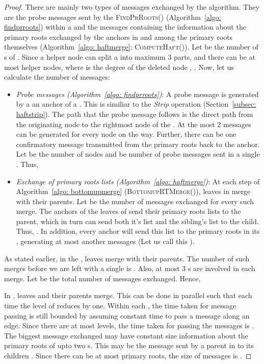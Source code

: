 \documentclass[11pt, letter]{article}
\begin{document}
\begin{proof} There are mainly two types of messages exchanged by the algorithm. They are the probe messages sent by the
\textsc{FindPrRoots()} (Algorithm~\ref{algo: findprroots}) within a  and the messages containing the information
about the primary roots exchanged by the anchors in  and among the primary roots themselves (Algorithm~\ref{algo:
haftmerge}: \textsc{ComputeHaft()}). Let  be the number of s of . Since a helper
node can split a  into maximum 3 parts, and there can be at most  helper nodes, where  is the degree of the
deleted node , .
Now, let us calculate the number of messages:
\begin{itemize}
\item \emph{Probe messages (Algorithm~\ref{algo: findprroots})}: A probe message is generated by a
 an anchor of a . This is similiar to the \emph{Strip} operation
(Section~\ref{subsec: haftstrip}). The path that the probe message follows is the direct path from the originating
node to the rightmost node of the . At the most 2 messages can be generated for every node on the way. Further,
there can be one confirmatory message transmitted from the primary roots back to the anchor. Let  be 
the number of nodes and  be number of probe messages sent in a single .
Thus, 

\item \emph{Exchange of primary roots lists (Algorithm~\ref{algo: haftmerge})}:  At each step of Algorithm~\ref{algo:
bottomupmerge} (\textsc{BottomupRTMerge()}), leaves in  merge with their parents. Let 
be the number of messages exchanged for every such merge.  The anchors of the leaves of  send their primary
roots lists to the parent, which in turn can send both it's list and the sibling's list to the child.  Thus,
. In addition, every anchor will send this list to the primary roots in its , generating at most
another  messages (Let us call this ).
\end{itemize}
As stated earlier, in the , leaves merge with their parents. The number of such merges
before we are left with a single  is . Also, at most 3 s are involved in
each merge. Let  be the total number of messages exchanged. Hence,


 In , leaves and their parents merge. This can be done in parallel such that each time the level of 
reduces by one. Within each , the time taken for message passing is still bounded by 
assuming constant time to pass a message along an edge. Since there are at most  levels, the time
taken for passing the messages is . The biggest message exchanged may have constant size information
about the primary roots of upto two s. This may be the message sent by a parent  in  to its children
. Since there can be at most  primary roots, the size of messages is .
\end{proof}
\end{document}
